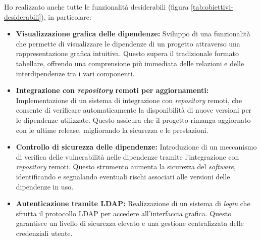 Ho realizzato anche tutte le funzionalità desiderabili (figura \ref{tab:obiettivi-desiderabili}), in particolare:
\begin{itemize}
  \item \textbf{Visualizzazione grafica delle dipendenze:} Sviluppo di una funzionalità che permette di visualizzare 
  le dipendenze di un progetto attraverso una rappresentazione grafica intuitiva. Questo supera il tradizionale formato tabellare, 
  offrendo una comprensione più immediata delle relazioni e delle interdipendenze tra i vari componenti.
  \item \textbf{Integrazione con \textit{repository} remoti per aggiornamenti:} Implementazione di un sistema di integrazione con \textit{repository} remoti, 
  che consente di verificare automaticamente la disponibilità di nuove versioni per le dipendenze utilizzate. 
  Questo assicura che il progetto rimanga aggiornato con le ultime release, migliorando la sicurezza e le prestazioni.
  \item \textbf{Controllo di sicurezza delle dipendenze:} Introduzione di un meccanismo di verifica delle vulnerabilità 
  nelle dipendenze tramite l'integrazione con \textit{repository} remoti. Questo strumento aumenta la sicurezza del \textit{software}, identificando e segnalando eventuali rischi associati alle versioni delle dipendenze in uso.
  \item \textbf{Autenticazione tramite LDAP:} Realizzazione di un sistema di \textit{login} che sfrutta il protocollo LDAP 
  per accedere all'interfaccia grafica. 
   Questo garantisce un livello di sicurezza elevato e una gestione centralizzata delle credenziali utente.
  \end{itemize}

